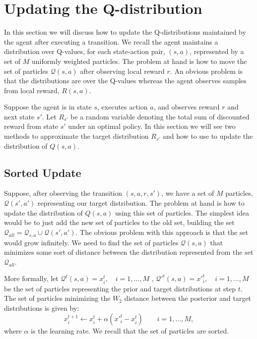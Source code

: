 \section{Updating the Q-distribution} \label{sec:updating_q_distributions}
In this section we will discuss how to update the Q-distributions maintained by the agent after executing a transition. We recall the agent maintains a distribution over Q-values, for each state-action pair, $(s,a)$, represented by a set of $M$ uniformly weighted particles. The problem at hand is how to move the set of particles $\mathcal{Q}(s,a)$ after observing local reward $r$. An obvious problem is that the distributions are over the Q-values whereas the agent observes samples from local reward, $R(s,a)$.
\par Suppose the agent is in state $s$, executes action $a$, and observes reward $r$ and next state $s'$. Let $R_{s'}$ be a random variable denoting the total sum of discounted reward from state $s'$ under an optimal policy. In this section we will see two methods to approximate the target distribution $R_{s'}$ and how to use to update the distribution of $Q(s,a)$.
\subsection{Sorted Update}
Suppose, after observing the transition $(s,a,r,s')$, we have a set of $M$ particles, $\mathcal{Q}(s',a')$ representing our target distribution. The problem at hand is how to update the distribution of $Q(s,a)$ using this set of particles. The simplest idea would be to just add the new set of particles to the old set, building the set $\mathcal{Q}_{all}= \mathcal{Q}_{s,a} \cup \mathcal{Q}(s',a')$. The obvious problem with this approach is that the set would grow infinitely. We need to find the set of particles $\mathcal{Q}(s,a)$ that minimizes some sort of distance between the distribution represented from the set $\mathcal{Q}_{all}$. \par 
More formally, let $\mathcal{Q}^t(s,a)=x^t_i, \quad i=1,\ldots,M$ , $\mathcal{Q}'^t(s,a)=x'^t_i, \quad i=1,\ldots,M$ be the set of particles representing the prior and target distributions at step $t$. The set of particles minimizing the $W_2$ distance between the posterior and target distributions is given by:
\begin{equation}
	\label{eq:sorted_update}
	x^{t+1}_i \leftarrow x^{t}_i + \alpha (x'^{t}_i - x^{t}_i) \qquad i=1,\ldots,M, 
\end{equation}
where $\alpha$ is the learning rate. We recall that the set of particles are sorted. 
